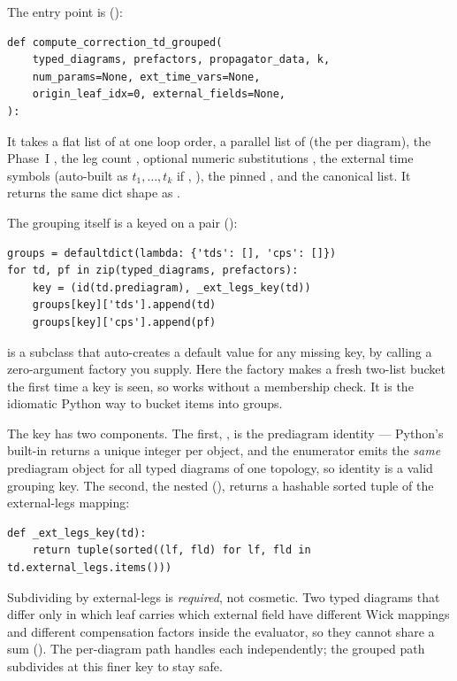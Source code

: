 The entry point is 
():
\begin{lstlisting}
def compute_correction_td_grouped(
    typed_diagrams, prefactors, propagator_data, k,
    num_params=None, ext_time_vars=None,
    origin_leaf_idx=0, external_fields=None,
):
\end{lstlisting}
It takes a flat list of  at one loop order, a parallel list
of  (the  per diagram), the Phase~I
, the leg count , optional numeric substitutions
, the external time symbols  (auto-built as
$t_1,\dots,t_k$ if , ), the pinned
, and the canonical  list. It
returns the same dict shape as .

The grouping itself is a  keyed on a pair
():
\begin{lstlisting}
groups = defaultdict(lambda: {'tds': [], 'cps': []})
for td, pf in zip(typed_diagrams, prefactors):
    key = (id(td.prediagram), _ext_legs_key(td))
    groups[key]['tds'].append(td)
    groups[key]['cps'].append(pf)
\end{lstlisting}

\begin{defn}
 is a  subclass that auto-creates a
default value for any missing key, by calling a zero-argument factory you supply.
Here the factory  makes a fresh
two-list bucket the first time a key is seen, so
 works without a membership check. It is the
idiomatic Python way to bucket items into groups.
\end{defn}

The key has two components. The first, , is the prediagram
identity --- Python's built-in  returns a unique integer per object, and
the enumerator emits the \emph{same} prediagram object for all typed diagrams of one
topology, so identity is a valid grouping key. The second, the nested
 (), returns a hashable
sorted tuple of the external-legs mapping:
\begin{lstlisting}
def _ext_legs_key(td):
    return tuple(sorted((lf, fld) for lf, fld in td.external_legs.items()))
\end{lstlisting}
Subdividing by external-legs is \emph{required}, not cosmetic. Two typed diagrams
that differ only in which leaf carries which external field have different Wick
mappings and different compensation factors inside the evaluator, so they cannot
share a sum (). The per-diagram path handles
each independently; the grouped path subdivides at this finer key to stay safe.

